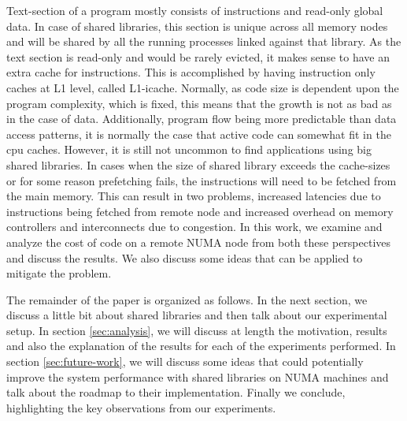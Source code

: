 Text-section of a program mostly consists of instructions and read-only global data. In case of shared libraries, this section
is unique across all memory nodes and will be shared by all the running processes linked against that library. As the text
section is read-only and would be rarely evicted, it makes sense to have an extra cache for instructions. This is accomplished
by having instruction only caches at L1 level, called L1-icache. Normally, as code size is dependent upon the program complexity,
which is fixed, this means that the growth is not as bad as in the case of data. Additionally, program flow being more predictable
than data access patterns, it is normally the case that active code can somewhat fit in the cpu caches.
However, it is still not uncommon to find applications using big shared libraries. In cases when the size of shared library exceeds
the cache-sizes or for some reason prefetching fails, the instructions will need to be fetched from the main memory.
This can result in two problems, increased latencies due to instructions being fetched from remote node and increased overhead on
memory controllers and interconnects due to congestion. In this work, we examine and analyze the cost of code on a remote NUMA
node from both these perspectives and discuss the results. We also discuss some ideas that can be applied to mitigate the problem.

The remainder of the paper is organized as follows. In the next section, we discuss a little bit about shared libraries and 
then talk about our experimental setup. In section \ref{sec:analysis}, we will discuss at length the motivation, results and also the explanation
of the results for each of the experiments performed. In section \ref{sec:future-work}, we will discuss some ideas that could potentially improve
the system performance with shared libraries on NUMA machines and talk about the roadmap to their implementation.
Finally we conclude, highlighting the key observations from our experiments.

